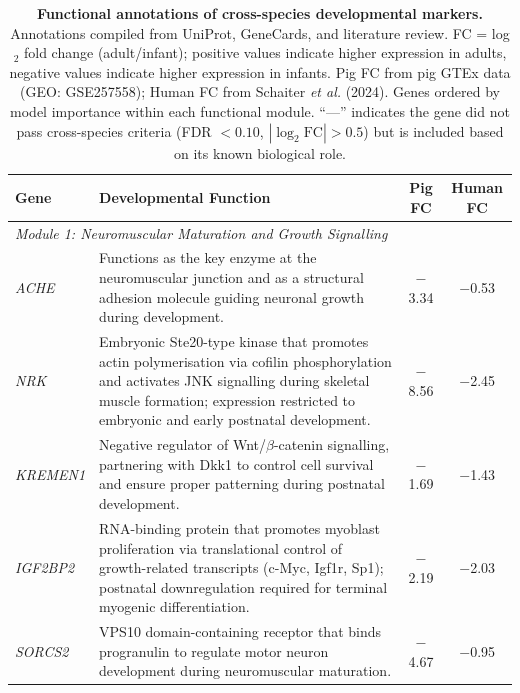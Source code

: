 \documentclass[10pt,a4paper]{article}
\begin{document}
\begin{landscape}
\begin{table}[p]
  \centering
  \caption{\textbf{Functional annotations of cross-species developmental markers.} Annotations compiled from UniProt, GeneCards, and literature review. FC = log$_2$ fold change (adult/infant); positive values indicate higher expression in adults, negative values indicate higher expression in infants. Pig FC from pig GTEx data (GEO: GSE257558); Human FC from Schaiter \textit{et al.} (2024). Genes ordered by model importance within each functional module. ``---'' indicates the gene did not pass cross-species criteria (FDR $< 0.10$, $|\log_2\text{FC}| > 0.5$) but is included based on its known biological role.}
  \label{tab:S3}
  \scriptsize
  \setlength{\tabcolsep}{4pt}
  \begin{tabularx}{\linewidth}{lXcc}
    \toprule
    Gene & Developmental Function & Pig FC & Human FC \\
    \midrule
    \multicolumn{4}{l}{\textit{Module 1: Neuromuscular Maturation and Growth Signalling}} \\
    \textit{ACHE} & Functions as the key enzyme at the neuromuscular junction and as a structural adhesion molecule guiding neuronal growth during development\cite{rotundo_expression_2003}. & $-$3.34 & $-$0.53 \\
    \textit{NRK} & Embryonic Ste20-type kinase that promotes actin polymerisation via cofilin phosphorylation and activates JNK signalling during skeletal muscle formation; expression restricted to embryonic and early postnatal development\cite{kanai-azuma_nrk_1999}. & $-$8.56 & $-$2.45 \\
    \textit{KREMEN1} & Negative regulator of Wnt/$\beta$-catenin signalling, partnering with Dkk1 to control cell survival and ensure proper patterning during postnatal development\cite{osada_wnt_2006,qin_canonical_2024}. & $-$1.69 & $-$1.43 \\
    \textit{IGF2BP2} & RNA-binding protein that promotes myoblast proliferation via translational control of growth-related transcripts (c-Myc, Igf1r, Sp1); postnatal downregulation required for terminal myogenic differentiation\cite{li_hmga2-igf2bp2_2012}. & $-$2.19 & $-$2.03 \\
    \textit{SORCS2} & VPS10 domain-containing receptor that binds progranulin to regulate motor neuron development during neuromuscular maturation\cite{thomasen_sorcs2_2023}. & $-$4.67 & $-$0.95 \\

\end{tabularx}
\end{table}
\end{landscape}
\end{document}
